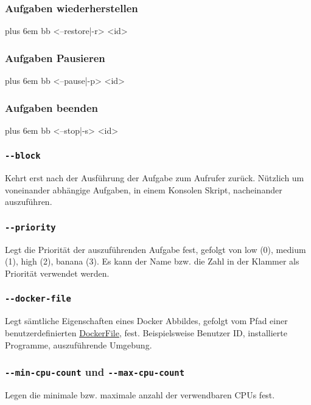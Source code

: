 \documentclass[a4paper,12pt]{article}
\makeatletter
\newenvironment{mycode}
 {\def\@xobeysp{\ }\verbatim\rightskip=0pt plus 6em\relax}
 {\endverbatim}
\makeatother
\begin{document}
\subsubsection{Aufgaben wiederherstellen}
\begin{mycode}
bb <--restore|-r> <id>
\end{mycode}
\subsubsection{Aufgaben Pausieren}
\begin{mycode}
bb <--pause|-p> <id>
\end{mycode}
\subsubsection{Aufgaben beenden}
\begin{mycode}
bb <--stop|-s> <id>
\end{mycode}

\subsubsection{\texttt{-{}-block}}
Kehrt erst nach der Ausführung der Aufgabe zum Aufrufer zurück. Nützlich um voneinander abhängige Aufgaben, in einem Konsolen Skript, nacheinander auszuführen.

\subsubsection{\texttt{-{}-priority}}
Legt die Priorität der auszuführenden Aufgabe fest, gefolgt von low (0), medium (1), high (2), banana (3).
Es kann der Name bzw. die Zahl in der Klammer als Priorität verwendet werden.

\subsubsection{\texttt{-{}-docker-file}}
Legt sämtliche Eigenschaften eines Docker Abbildes, gefolgt vom Pfad einer benutzerdefinierten \href{https://docs.docker.com/engine/reference/builder/}{DockerFile}, fest.
Beispielsweise Benutzer ID, installierte Programme, auszuführende Umgebung.

\subsubsection{\texttt{-{}-min-cpu-count} und \texttt{-{}-max-cpu-count}}
Legen die minimale bzw. maximale anzahl der verwendbaren \glspl{CPU} fest.
\end{document}
